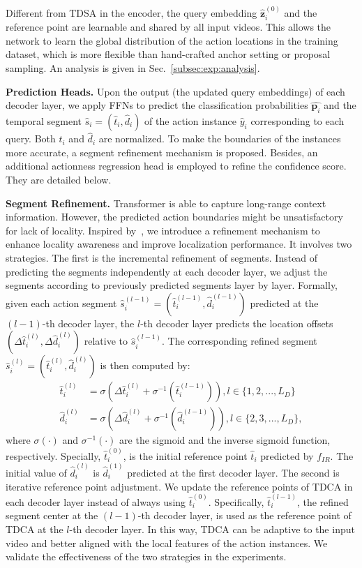 \documentclass[lettersize,journal]{IEEEtran}
\begin{document}
Different from TDSA in the encoder, the query embedding $\hat{\boldsymbol{z}}_{i}^{(0)}$ and the reference point are learnable and shared by all input videos. This allows the network to learn the global distribution of the action locations in the training dataset, which is more flexible than hand-crafted anchor setting or proposal sampling. An analysis is given in Sec.~\ref{subsec:exp:analysis}.


\vspace{1ex}\noindent\textbf{Prediction Heads.} Upon the output (the updated query embeddings) of each decoder layer, we apply FFNs to predict the classification probabilities $\hat{\boldsymbol{p}_i}$ and the temporal segment $\hat{s}_i=(\hat{t}_i, \hat{d}_i)$ of the action instance $\hat{y}_i$ corresponding to each query. Both $\hat{t}_i$ and $\hat{d}_i$ are normalized. To make the boundaries of the instances more accurate, a segment refinement mechanism is proposed. Besides, an additional actionness regression head is employed to refine the confidence score. They are detailed below.

\vspace{1ex}\noindent\textbf{Segment Refinement.} Transformer is able to capture long-range context information. However, the predicted action boundaries might be unsatisfactory for lack of locality. Inspired by~\cite{zhu2021deformable}, we introduce a refinement mechanism to enhance locality awareness and improve localization performance. 
It involves two strategies. The first is the incremental refinement of segments. Instead of predicting the segments independently at each decoder layer, we adjust the segments according to previously predicted segments layer by layer.
Formally, given each action segment $\hat{s}_i^{(l-1)}=(\hat{t}_i^{(l-1)}, \hat{d}_i^{(l-1)})$ predicted at the $(l-1)$-th decoder layer, the $l$-th decoder layer predicts the location offsets $(\Delta \hat{t}_i^{(l)}, \Delta \hat{d}_i^{(l)})$ relative to $\hat{s}_i^{(l-1)}$. The corresponding refined segment $\hat{s}_i^{(l)}=(\hat{t}_i^{(l)}, \hat{d}_i^{(l)})$ is then computed by:
\begin{align}
    \hat{t}_i^{(l)}&=\sigma(\Delta \hat{t}_i^{(l)}+ \sigma^{-1}(\hat{t}_i^{(l-1)})), l\in \{1, 2,...,L_D\}\\
    \hat{d}_i^{(l)}&=\sigma(\Delta \hat{d}_i^{(l)}+ \sigma^{-1}(\hat{d}_i^{(l-1)})), l\in \{2, 3,...,L_D\},
\end{align}
where $\sigma(\cdot)$ and $\sigma^{-1}(\cdot)$ are the sigmoid and the inverse sigmoid function, respectively.  Specially, $\hat{t}_i^{(0)}$, is the initial reference point $\hat{t}_i$ predicted by $f_{IR}$. The initial value of $\hat{d}_i^{(l)}$ is $\hat{d}_i^{(1)}$ predicted at the first decoder layer. 
The second is iterative reference point adjustment. We update the reference points of TDCA in each decoder layer instead of always using $\hat{t}_i^{(0)}$. Specifically, $\hat{t}_i^{(l-1)}$, the refined segment center at the $(l-1)$-th decoder layer, is used as the reference point of TDCA at the $l$-th decoder layer. 
In this way, TDCA can be adaptive to the input video and better aligned with the local features of the action instances. We validate the effectiveness of the two strategies in the experiments.
\end{document}
